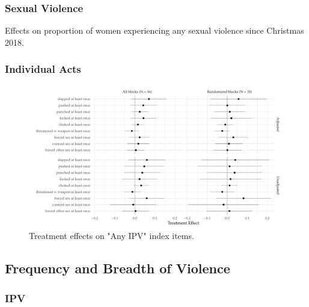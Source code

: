 \documentclass[11pt,english]{article}
\begin{document}
\subsubsection{Sexual Violence}

\begin{table}[H]
\centering

\caption{Effects on proportion of women experiencing any sexual violence since Christmas 2018.}
\label{tab:sexual}
\end{table}


\subsubsection{Individual Acts}

\begin{figure}[H]
\centering
\includegraphics[width = \textwidth]{figures/subitem_plot.pdf}
\caption{Treatment effects on "Any IPV" index items.}
\label{fig:subitems_plot}
\end{figure}

\subsection{Frequency and Breadth of Violence}

\subsubsection{IPV}
\end{document}
